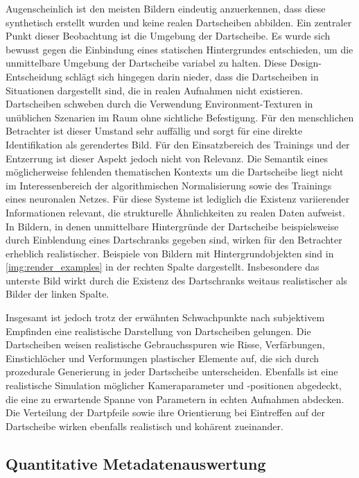 Augenscheinlich ist den meisten Bildern eindeutig anzuerkennen, dass diese synthetisch erstellt wurden und keine realen Dartscheiben abbilden. Ein zentraler Punkt dieser Beobachtung ist die Umgebung der Dartscheibe. Es wurde sich bewusst gegen die Einbindung eines statischen Hintergrundes entschieden, um die unmittelbare Umgebung der Dartscheibe variabel zu halten. Diese Design-Entscheidung schlägt sich hingegen darin nieder, dass die Dartscheiben in Situationen dargestellt sind, die in realen Aufnahmen nicht existieren. Dartscheiben schweben durch die Verwendung Environment-Texturen in unüblichen Szenarien im Raum ohne sichtliche Befestigung. Für den menschlichen Betrachter ist dieser Umstand sehr auffällig und sorgt für eine direkte Identifikation als gerendertes Bild. Für den Einsatzbereich des Trainings und der Entzerrung ist dieser Aspekt jedoch nicht von Relevanz. Die Semantik eines möglicherweise fehlenden thematischen Kontexts um die Dartscheibe liegt nicht im Interessenbereich der algorithmischen Normalisierung sowie des Trainings eines neuronalen Netzes. Für diese Systeme ist lediglich die Existenz variierender Informationen relevant, die strukturelle Ähnlichkeiten zu realen Daten aufweist. In Bildern, in denen unmittelbare Hintergründe der Dartscheibe beispielsweise durch Einblendung eines Dartschranks gegeben sind, wirken für den Betrachter erheblich realistischer. Beispiele von Bildern mit Hintergrundobjekten sind in \autoref{img:render_examples} in der rechten Spalte dargestellt. Insbesondere das unterste Bild wirkt durch die Existenz des Dartschranks weitaus realistischer als Bilder der linken Spalte.

Insgesamt ist jedoch trotz der erwähnten Schwachpunkte nach subjektivem Empfinden eine realistische Darstellung von Dartscheiben gelungen. Die Dartscheiben weisen realistische Gebrauchsspuren wie Risse, Verfärbungen, Einstichlöcher und Verformungen plastischer Elemente auf, die sich durch prozedurale Generierung in jeder Dartscheibe unterscheiden. Ebenfalls ist eine realistische Simulation möglicher Kameraparameter und -positionen abgedeckt, die eine zu erwartende Spanne von Parametern in echten Aufnahmen abdecken. Die Verteilung der Dartpfeile sowie ihre Orientierung bei Eintreffen auf der Dartscheibe wirken ebenfalls realistisch und kohärent zueinander.


\subsection{Quantitative Metadatenauswertung} %
\label{sec:metadaten}

